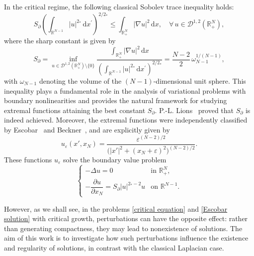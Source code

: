 \documentclass[12pt,reqno]{amsart}
\begin{document}
In the critical regime, the following classical Sobolev trace inequality holds:  
\begin{equation}\label{classical trace embedding}
    S_{\partial} \left( \int_{\mathds{R}^{N-1}} |u|^{2_\ast} \, \mathrm{d}x^\prime \right)^{2/2_\ast} 
    \leq \int_{\mathds{R}^N_+} |\nabla u|^2 \, \mathrm{d}x, 
    \quad \forall\, u \in \mathcal{D}^{1,2}(\mathds{R}^N_+),
\end{equation}
where the sharp constant is given by  
\begin{equation}\label{trace best constant}
    S_{\partial} 
    = \inf_{u \in \mathcal{D}^{1,2}(\mathds{R}^N_+) \setminus \{0\}} 
    \frac{\int_{\mathds{R}^N_+} |\nabla u|^2 \, \mathrm{d}x}
    {\left( \int_{\mathds{R}^{N-1}} |u|^{2_\ast} \, \mathrm{d}x^\prime \right)^{2/2_\ast}}
    = \frac{N-2}{2} \, \omega_{N-1}^{1/(N-1)},
\end{equation}
with $\omega_{N-1}$ denoting the volume of the $(N-1)$-dimensional unit sphere.  
This inequality plays a fundamental role in the analysis of variational problems with boundary nonlinearities and provides the natural framework for studying extremal functions attaining the best constant $S_\partial$. P.-L. Lions~\cite{Lions} proved that $S_{\partial}$ is indeed achieved. Moreover, the extremal functions were independently classified by Escobar~\cite{Escobar1} and Beckner~\cite{Beckner}, and are explicitly given by  
\begin{equation}\label{instanton}
    u_\varepsilon(x',x_N) 
    = \frac{\varepsilon^{(N-2)/2}}
    {\bigl(|x'|^2 + (x_N + \varepsilon)^2\bigr)^{(N-2)/2}}.
\end{equation}
These functions $u_\varepsilon$ solve the boundary value problem  
\begin{equation}\label{Escobar solution}
	\begin{cases}
		-\Delta u = 0 & \text{in } \mathds{R}^N_+, \\[0.3em]
		-\dfrac{\partial u}{\partial x_N} = S_\partial |u|^{2_\ast-2}u 
        & \text{on } \mathds{R}^{N-1}.
	\end{cases}
\end{equation}

However, as we shall see, in the problems \eqref{critical equation} and \eqref{Escobar solution} with critical growth, perturbations can have the opposite effect: rather than generating compactness, they may lead to nonexistence of solutions. The aim of this work is to investigate how such perturbations influence the existence and regularity of solutions, in contrast with the classical Laplacian case.
\end{document}
